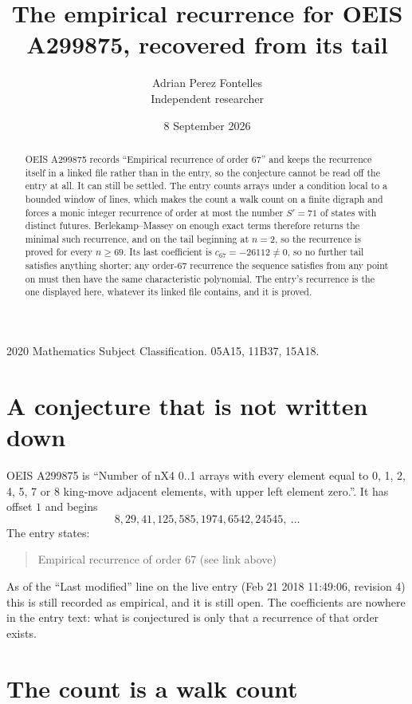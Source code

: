 \documentclass[11pt,a4paper]{article}
\title{The empirical recurrence for OEIS A299875, recovered from its tail}
\author{Adrian Perez Fontelles\\ \small Independent researcher}
\date{8 September 2026}
\theoremstyle{plain}
\theoremstyle{definition}
\begin{document}
\maketitle

\begin{abstract}
OEIS A299875 records ``Empirical recurrence of order $67$'' and keeps the recurrence itself in
a linked file rather than in the entry, so the conjecture cannot be read off the entry at all.
It can still be settled. The entry counts arrays under a condition local to a bounded window of
lines, which makes the count a walk count on a finite digraph and forces a monic integer
recurrence of order at most the number $S'=71$ of states with distinct futures. Berlekamp--Massey on
enough exact terms therefore returns the minimal such recurrence, and on the tail beginning at $n=2$, so the recurrence is proved for every $n\ge69$.
Its last coefficient is $c_{67}=-26112\neq0$, so no further tail satisfies anything
shorter; any order-$67$ recurrence the sequence satisfies from any point on must then have
the same characteristic polynomial. The entry's recurrence is the one displayed here, whatever
its linked file contains, and it is proved.
\end{abstract}

\noindent\small 2020 Mathematics Subject Classification. 05A15, 11B37, 15A18.\normalsize

\section{A conjecture that is not written down}

OEIS A299875 is ``Number of nX4 0..1 arrays with every element equal to 0, 1, 2, 4, 5, 7 or 8 king-move adjacent elements, with upper left element zero.''. It has offset $1$ and begins
\[
8, 29, 41, 125, 585, 1974, 6542, 24545,\ \dots
\]
The entry states:
\begin{quote}
Empirical recurrence of order 67 (see link above)
\end{quote}
As of the ``Last modified'' line on the live entry (Feb 21 2018 11:49:06, revision 4)
this is still recorded as empirical, and it is still open. The coefficients are nowhere in the
entry text: what is conjectured is only that a recurrence of that order exists.

\section{The count is a walk count}
\end{document}
